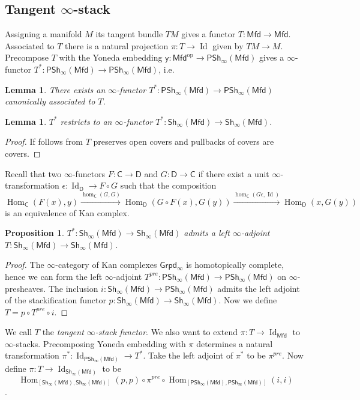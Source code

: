 \documentclass[12pt]{amsart}
\newtheorem{lem}[thm]{Lemma}
\newtheorem{prop}[thm]{Proposition}
\theoremstyle{definition}
\theoremstyle{remark}
\numberwithin{equation}{section}
\newcommand{\CC}{{\mathsf C}}
\newcommand{\CD}{{\mathsf D}}
\newcommand{\1}{{\mathbb{1}}}
\newcommand{\y}{\mathsf{y}}
\newcommand{\op}{\operatorname{op}}
\newcommand{\mfd}{\mathsf{Mfd}}
\newcommand{\igpd}{\mathsf{Grpd_{\infty}}}
\newcommand{\shi}{\mathsf{Sh}_{\infty}}
\newcommand{\pshi}{\mathsf{PSh_{\infty}}}
\newcommand{\Hom}{\operatorname{Hom}}
\newcommand{\id}{\operatorname{Id}}
\begin{document}
\subsection{Tangent $\infty$-stack}
Assigning a manifold $M$ its tangent bundle $TM$ gives a functor $T: \mfd \to \mfd$. Associated to $T$ there is a natural projection $\pi : T \to \id$ given by $TM \to M$. Precompose $T$ with the Yoneda embedding $\y:\mfd^{\op} \to \pshi(\mfd)$ gives a $\infty$-functor $T^*: \pshi(\mfd) \to \pshi(\mfd)$, i.e.

\begin{center}
\end{center}

\begin{lem} There exists an $\infty$-functor $T^*: \pshi(\mfd) \to \pshi(\mfd)$ canonically associated to $T$.
	\end{lem}

\begin{lem}
	$T^*$ restricts to an $\infty$-functor $T^*: \shi(\mfd) \to  \shi(\mfd)$.
\end{lem}
\begin{proof}
	If follows from $T$ preserves open covers and pullbacks of covers are covers. 
	\end{proof}

Recall that two $\infty$-functors $F:\CC \to \CD$ and $G:\CD \to \CC$ if there exist a unit $\infty$-transformation $\epsilon: \id_{\CD}\to F\circ G$ such that the composition
$$
\Hom_{\CC}(F(x), y) \stackrel{\hom_{\CC}(G, G)}{\longrightarrow }\Hom_{\CD}(G\circ F(x), G(y)) \stackrel{\hom_{\CC}(G\epsilon, \id)}{\longrightarrow} \Hom_{\CD}(x, G(y))
$$
is an equivalence of Kan complex.

\begin{prop}
	$T^*:\shi(\mfd) \to \shi(\mfd) $ admits a left $\infty$-adjoint $T: \shi(\mfd) \to \shi(\mfd)$. 
\end{prop}	

\begin{proof}The $\infty$-category of Kan complexes $\igpd$ is homotopically complete, hence we can form the left $\infty$-adjoint $T^{pre}:\pshi(\mfd) \to \pshi(\mfd)$ on $\infty$-presheaves. The inclusion $i:\shi(\mfd) \to \pshi(\mfd)$ admits the left adjoint of the stackification functor $p:\shi(\mfd) \to \shi(\mfd)$. Now we define $T = p\circ T^{pre} \circ i$.
	\end{proof}
We call $T$ the {\it tangent $\infty$-stack functor}. We also want to extend $\pi: T \to \id_{\mfd}$ to $\infty$-stacks. Precomposing Yoneda embedding with $\pi$ determines a natural transformation $\pi^*: \id_{\pshi(\mfd)} \to T^*$. Take the left adjoint of $\pi^*$ to be $\pi^{pre}$. Now define $\pi: T\to \id_{\shi(\mfd)}$ to be $$\Hom_{[\shi(\mfd),\shi(\mfd)]}(p,p)\circ \pi^{pre} \circ \Hom_{[\pshi(\mfd),\pshi(\mfd)]}(i,i)
$$.
\end{document}
